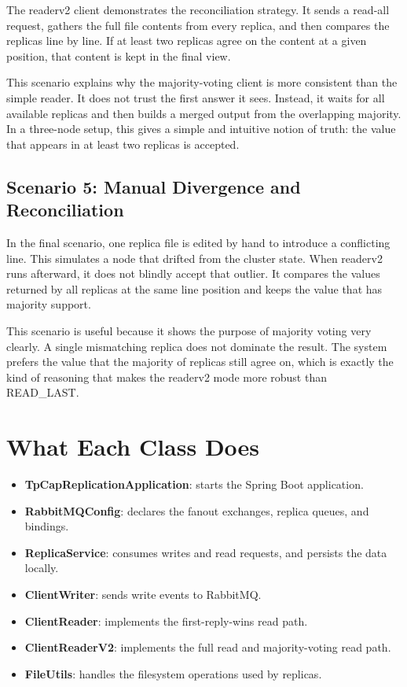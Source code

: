 \documentclass[11pt]{article}
\begin{document}
The readerv2 client demonstrates the reconciliation strategy. It sends a read-all request, gathers the full file contents from every replica, and then compares the replicas line by line. If at least two replicas agree on the content at a given position, that content is kept in the final view.

This scenario explains why the majority-voting client is more consistent than the simple reader. It does not trust the first answer it sees. Instead, it waits for all available replicas and then builds a merged output from the overlapping majority. In a three-node setup, this gives a simple and intuitive notion of truth: the value that appears in at least two replicas is accepted.

\subsection{Scenario 5: Manual Divergence and Reconciliation}

In the final scenario, one replica file is edited by hand to introduce a conflicting line. This simulates a node that drifted from the cluster state. When readerv2 runs afterward, it does not blindly accept that outlier. It compares the values returned by all replicas at the same line position and keeps the value that has majority support.

This scenario is useful because it shows the purpose of majority voting very clearly. A single mismatching replica does not dominate the result. The system prefers the value that the majority of replicas still agree on, which is exactly the kind of reasoning that makes the readerv2 mode more robust than READ_LAST.

\section{What Each Class Does}

\begin{itemize}[leftmargin=1.4em]
  \item \textbf{TpCapReplicationApplication}: starts the Spring Boot application.
  \item \textbf{RabbitMQConfig}: declares the fanout exchanges, replica queues, and bindings.
  \item \textbf{ReplicaService}: consumes writes and read requests, and persists the data locally.
  \item \textbf{ClientWriter}: sends write events to RabbitMQ.
  \item \textbf{ClientReader}: implements the first-reply-wins read path.
  \item \textbf{ClientReaderV2}: implements the full read and majority-voting read path.
  \item \textbf{FileUtils}: handles the filesystem operations used by replicas.
\end{itemize}
\end{document}
